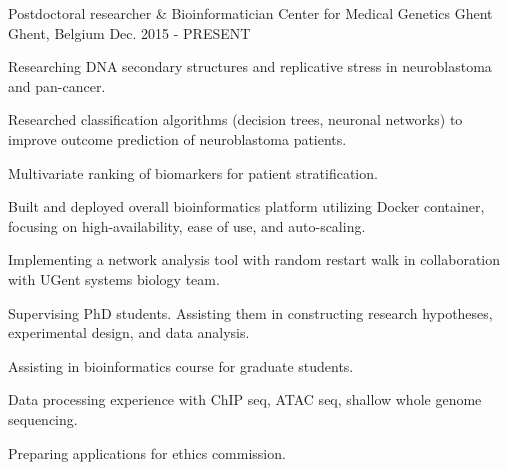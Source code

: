 

\begin{cventries}
  \cventry
    {Postdoctoral researcher \& Bioinformatician} %
    {Center for Medical Genetics Ghent} %
    {Ghent, Belgium} %
    {Dec. 2015 - PRESENT} %
    {
      \begin{cvitems} %
        \item {Researching DNA secondary structures and replicative
            stress in neuroblastoma and pan-cancer.}
        \item {Researched classification algorithms (decision trees,
            neuronal networks) to improve outcome prediction of
            neuroblastoma patients.}
        \item {Multivariate ranking of biomarkers for patient stratification.}
      \item {Built and deployed overall bioinformatics platform
          utilizing Docker container, focusing on high-availability,
          ease of use, and auto-scaling.}
      \item {Implementing a network analysis tool with random restart
          walk in collaboration with UGent systems biology team.}
      \item {Supervising PhD students. Assisting them in constructing
          research hypotheses, experimental design, and data
          analysis.}
      \item {Assisting in bioinformatics course for graduate
          students.}
      \item {Data processing experience with ChIP seq, ATAC seq,
          shallow whole genome sequencing.}
      \item {Preparing applications for ethics commission.}
      \end{cvitems}
    }


\end{cventries}
